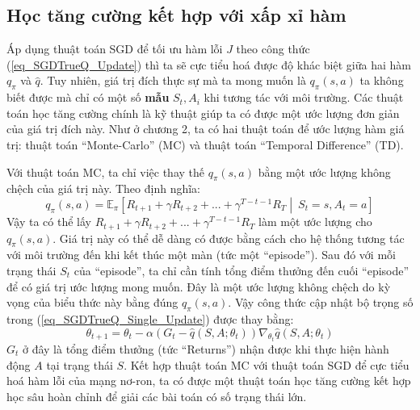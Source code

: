\subsection{Học tăng cường kết hợp với xấp xỉ hàm}
	Áp dụng thuật toán SGD để tối ưu hàm lỗi $J$ theo công thức (\ref{eq_SGDTrueQ_Update}) thì ta sẽ cực tiểu hoá được độ khác biệt giữa hai hàm $q_{\pi}$ và $\hat{q}$.
	Tuy nhiên, giá trị đích thực sự mà ta mong muốn là $q_{\pi}(s,a)$ ta không biết được mà chỉ có một số \textbf{mẫu} $S_t, A_i$ khi tương tác với môi trường.
	Các thuật toán học tăng cường chính là kỹ thuật giúp ta có được một ước lượng đơn giản của giá trị đích này.
	Như ở chương 2, ta có hai thuật toán để ước lượng hàm giá trị: thuật toán ``Monte-Carlo'' (MC) và thuật toán ``Temporal Difference'' (TD).
	
	Với thuật toán MC, ta chỉ việc thay thế $q_{\pi}(s,a)$ bằng một ước lượng không chệch của giá trị này.
	Theo định nghĩa:
	\begin{equation}
		\label{eq_q_def}
		q_{\pi}(s,a) = \mathbb{E}_{\pi}\left [R_{t+1} + \gamma R_{t + 2} + ... + \gamma^{T-t-1}R_T \middle|\ \mathit{S}_t=s, \mathit{A}_t=a\right ]
	\end{equation}
	Vậy ta có thể lấy $R_{t+1} + \gamma R_{t + 2} + ... + \gamma^{T-t-1}R_T$ làm một ước lượng cho $q_{\pi}(s,a)$.
	Giá trị này có thể dễ dàng có được bằng cách cho hệ thống tương tác với môi trường đến khi kết thúc một màn (tức một ``episode'').
	Sau đó với mỗi trạng thái $S_t$ của ``episode'', ta chỉ cần tính tổng điểm thưởng đến cuối ``episode'' để có giá trị ước lượng mong muốn.
	Đây là một ước lượng không chệch do kỳ vọng của biểu thức này bằng đúng $q_{\pi}(s,a)$.
	Vậy công thức cập nhật bộ trọng số trong (\ref{eq_SGDTrueQ_Single_Update}) được thay bằng:
	\begin{equation}
		\label{eq_SGD_MC_Update}
		\theta_{t+1} = \theta_t - \alpha (G_t - \hat{q}(S,A;\theta_t)) \nabla_{\theta_t} \hat{q}(S, A;\theta_t)
	\end{equation}
	$G_t$ ở đây là tổng điểm thưởng (tức ``Returns'') nhận được khi thực hiện hành động $A$ tại trạng thái $S$.
	Kết hợp thuật toán MC với thuật toán SGD để cực tiểu hoá hàm lỗi của mạng nơ-ron, ta có được một thuật toán học tăng cường kết hợp học sâu hoàn chỉnh để giải các bài toán có số trạng thái lớn.
	
